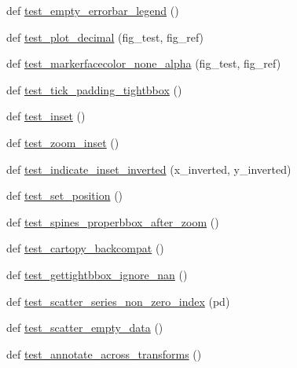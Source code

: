 \begin{DoxyCompactItemize}
\item 
def \hyperlink{namespacematplotlib_1_1tests_1_1test__axes_af9e2604826ef30c43fc8072ce0361198}{test\+\_\+empty\+\_\+errorbar\+\_\+legend} ()
\item 
def \hyperlink{namespacematplotlib_1_1tests_1_1test__axes_a1589446a4de26988bd914214af0da758}{test\+\_\+plot\+\_\+decimal} (fig\+\_\+test, fig\+\_\+ref)
\item 
def \hyperlink{namespacematplotlib_1_1tests_1_1test__axes_ad342d8fadff8a8afc77d2749ff1c4c01}{test\+\_\+markerfacecolor\+\_\+none\+\_\+alpha} (fig\+\_\+test, fig\+\_\+ref)
\item 
def \hyperlink{namespacematplotlib_1_1tests_1_1test__axes_a8c0f2b665640cb0196e850c247fd812d}{test\+\_\+tick\+\_\+padding\+\_\+tightbbox} ()
\item 
def \hyperlink{namespacematplotlib_1_1tests_1_1test__axes_ae0f2bbe394fe07dec94f08033c9a80ad}{test\+\_\+inset} ()
\item 
def \hyperlink{namespacematplotlib_1_1tests_1_1test__axes_aaa302ac07ee44e6b198984340b0df579}{test\+\_\+zoom\+\_\+inset} ()
\item 
def \hyperlink{namespacematplotlib_1_1tests_1_1test__axes_a6ecaa2b961e7754370262d9d79b270f0}{test\+\_\+indicate\+\_\+inset\+\_\+inverted} (x\+\_\+inverted, y\+\_\+inverted)
\item 
def \hyperlink{namespacematplotlib_1_1tests_1_1test__axes_aa1f212cd42b9b029f6baa4f2bc7b5f9c}{test\+\_\+set\+\_\+position} ()
\item 
def \hyperlink{namespacematplotlib_1_1tests_1_1test__axes_a3825259c0b6e545bf3d112f45c4797f0}{test\+\_\+spines\+\_\+properbbox\+\_\+after\+\_\+zoom} ()
\item 
def \hyperlink{namespacematplotlib_1_1tests_1_1test__axes_aa869aaa84ed2a44e81366c31f1c54e5e}{test\+\_\+cartopy\+\_\+backcompat} ()
\item 
def \hyperlink{namespacematplotlib_1_1tests_1_1test__axes_a4dcbd92ef43c41fc02389770e8851b25}{test\+\_\+gettightbbox\+\_\+ignore\+\_\+nan} ()
\item 
def \hyperlink{namespacematplotlib_1_1tests_1_1test__axes_abad9adfcdec405d3bb2611eb45b65d92}{test\+\_\+scatter\+\_\+series\+\_\+non\+\_\+zero\+\_\+index} (pd)
\item 
def \hyperlink{namespacematplotlib_1_1tests_1_1test__axes_aa959da21465431f16e2e6796335eed3c}{test\+\_\+scatter\+\_\+empty\+\_\+data} ()
\item 
def \hyperlink{namespacematplotlib_1_1tests_1_1test__axes_ae3292e173990db203e88b6d72b700053}{test\+\_\+annotate\+\_\+across\+\_\+transforms} ()

\end{DoxyCompactItemize}
